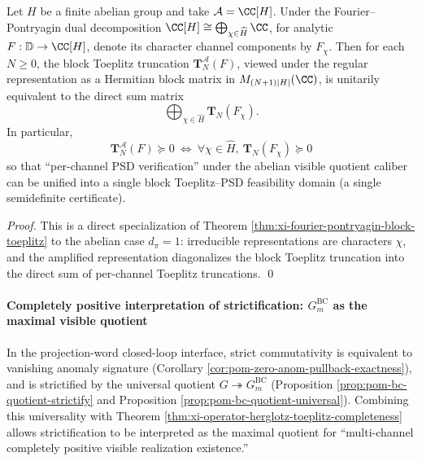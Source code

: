 \begin{corollary}\label{cor:xi-abelian-block-toeplitz-directsum}
Let \(H\) be a finite abelian group and take \(\mathcal{A}=\CC[H]\).
Under the Fourier--Pontryagin dual decomposition \(\CC[H]\cong \bigoplus_{\chi\in\widehat H}\CC\),
for analytic \(F:\mathbb{D}\to\CC[H]\), denote its character channel components by \(F_\chi\).
Then for each \(N\ge 0\), the block Toeplitz truncation \(\mathbf{T}^{\mathcal{A}}_N(F)\), viewed under the regular representation as a Hermitian block matrix in \(M_{(N+1)|H|}(\CC)\), is unitarily equivalent to the direct sum matrix
\[
\bigoplus_{\chi\in\widehat H}\mathbf{T}_N(F_\chi).
\]
In particular,
\[
\boxed{\;
\mathbf{T}^{\mathcal{A}}_N(F)\succeq 0
\ \Longleftrightarrow\
\forall\chi\in\widehat H,\ \mathbf{T}_N(F_\chi)\succeq 0\;}
\]
so that ``per-channel PSD verification'' under the abelian visible quotient caliber can be unified into a single block Toeplitz--PSD feasibility domain (a single semidefinite certificate).
\end{corollary}

\begin{proof}
This is a direct specialization of Theorem \ref{thm:xi-fourier-pontryagin-block-toeplitz} to the abelian case \(d_\pi=1\): irreducible representations are characters \(\chi\), and the amplified representation diagonalizes the block Toeplitz truncation into the direct sum of per-channel Toeplitz truncations. \qed
\end{proof}

\paragraph{Completely positive interpretation of strictification: \texorpdfstring{$G^{\mathrm{BC}}_m$}{GBCm} as the maximal visible quotient}
In the projection-word closed-loop interface, strict commutativity is equivalent to vanishing anomaly signature (Corollary \ref{cor:pom-zero-anom-pullback-exactness}), and is strictified by the universal quotient \(G\twoheadrightarrow G^{\mathrm{BC}}_m\) (Proposition \ref{prop:pom-bc-quotient-strictify} and Proposition \ref{prop:pom-bc-quotient-universal}).
Combining this universality with Theorem \ref{thm:xi-operator-herglotz-toeplitz-completeness} allows strictification to be interpreted as the maximal quotient for ``multi-channel completely positive visible realization existence.''

